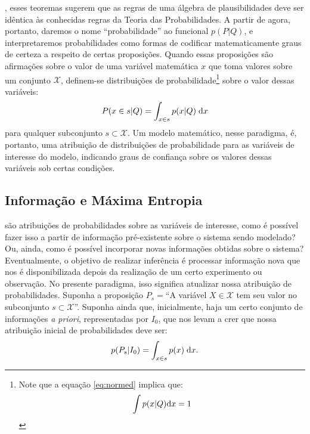 , esses teoremas sugerem que as regras de uma álgebra de plausibilidades deve ser idêntica às conhecidas regras da Teoria das Probabilidades. A partir de agora, portanto, daremos o nome ``probabilidade'' ao funcional $p(P|Q)$, e interpretaremos probabilidades como formas de codificar matematicamente graus de certeza a respeito de certas proposições. Quando essas proposições são afirmações sobre o valor de uma variável matemática $x$ que toma valores sobre um conjunto $\mathcal{X}$, definem-se distribuições de probabilidade\footnote{Note que a equação \eqref{eq:normed} implica que: \[\int p(x|Q)\mathrm{d} x  = 1\]} sobre o valor dessas variáveis:
\begin{equation}
 P(x \in s| Q) = \int_{x \in s} p(x | Q)\;\mathrm{d} x 
\end{equation}
para qualquer subconjunto $s \subset \mathcal{X}$. Um modelo matemático, nesse paradigma, é, portanto, uma atribuição de distribuições de probabilidade para as variáveis de interesse do modelo, indicando graus de confiança sobre os valores dessas variáveis sob certas condições. 

\subsection{Informação e Máxima Entropia}
 são atribuições de probabilidades sobre as variáveis de interesse, como é possível fazer isso a partir de informação pré-existente sobre o sistema sendo modelado? Ou, ainda, como é possível incorporar novas informações obtidas sobre o sistema? Eventualmente, o objetivo de realizar inferência é processar informação nova que nos é disponibilizada depois da realização de um certo experimento ou observação. No presente paradigma, isso significa atualizar nossa atribuição de probabilidades. Suponha a proposição $P_{s} =$``A variável $X\in \mathcal{X}$ tem seu valor no subconjunto $s\subset\mathcal{X}$''. Suponha ainda que, inicialmente, haja um certo conjunto de informações \emph{a priori}, representadas por $I_{0}$, que nos levam a crer que nossa atribuição inicial de probabilidades deve ser:
\[
 p(P_{s} | I_{0} ) = \int_{x\in s} p(x)\;\mathrm{d} x.
\]

